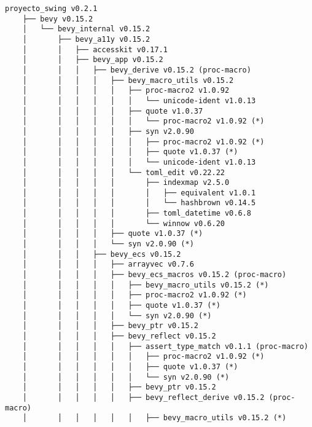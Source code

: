 





\begin{lstlisting}[style=mystyle, caption={dependencias del proyecto}, label={lst:dependencias}]
    proyecto_swing v0.2.1
    ├── bevy v0.15.2
    │   └── bevy_internal v0.15.2
    │       ├── bevy_a11y v0.15.2
    │       │   ├── accesskit v0.17.1
    │       │   ├── bevy_app v0.15.2
    │       │   │   ├── bevy_derive v0.15.2 (proc-macro)
    │       │   │   │   ├── bevy_macro_utils v0.15.2
    │       │   │   │   │   ├── proc-macro2 v1.0.92
    │       │   │   │   │   │   └── unicode-ident v1.0.13
    │       │   │   │   │   ├── quote v1.0.37
    │       │   │   │   │   │   └── proc-macro2 v1.0.92 (*)
    │       │   │   │   │   ├── syn v2.0.90
    │       │   │   │   │   │   ├── proc-macro2 v1.0.92 (*)
    │       │   │   │   │   │   ├── quote v1.0.37 (*)
    │       │   │   │   │   │   └── unicode-ident v1.0.13
    │       │   │   │   │   └── toml_edit v0.22.22
    │       │   │   │   │       ├── indexmap v2.5.0
    │       │   │   │   │       │   ├── equivalent v1.0.1
    │       │   │   │   │       │   └── hashbrown v0.14.5
    │       │   │   │   │       ├── toml_datetime v0.6.8
    │       │   │   │   │       └── winnow v0.6.20
    │       │   │   │   ├── quote v1.0.37 (*)
    │       │   │   │   └── syn v2.0.90 (*)
    │       │   │   ├── bevy_ecs v0.15.2
    │       │   │   │   ├── arrayvec v0.7.6
    │       │   │   │   ├── bevy_ecs_macros v0.15.2 (proc-macro)
    │       │   │   │   │   ├── bevy_macro_utils v0.15.2 (*)
    │       │   │   │   │   ├── proc-macro2 v1.0.92 (*)
    │       │   │   │   │   ├── quote v1.0.37 (*)
    │       │   │   │   │   └── syn v2.0.90 (*)
    │       │   │   │   ├── bevy_ptr v0.15.2
    │       │   │   │   ├── bevy_reflect v0.15.2
    │       │   │   │   │   ├── assert_type_match v0.1.1 (proc-macro)
    │       │   │   │   │   │   ├── proc-macro2 v1.0.92 (*)
    │       │   │   │   │   │   ├── quote v1.0.37 (*)
    │       │   │   │   │   │   └── syn v2.0.90 (*)
    │       │   │   │   │   ├── bevy_ptr v0.15.2
    │       │   │   │   │   ├── bevy_reflect_derive v0.15.2 (proc-macro)
    │       │   │   │   │   │   ├── bevy_macro_utils v0.15.2 (*)

\end{lstlisting}
